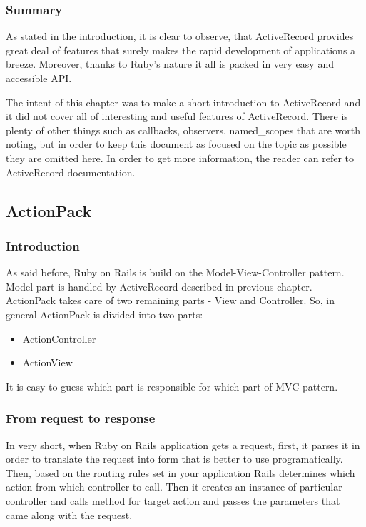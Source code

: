       \subsubsection{Summary}
      As stated in the introduction, it is clear to observe, that ActiveRecord provides great deal
      of features that surely makes the rapid development of applications a breeze. Moreover, thanks
      to Ruby's nature it all is packed in very easy and accessible API.

      The intent of this chapter was to make a short introduction to ActiveRecord and it did not cover
      all of interesting and useful features of ActiveRecord. There is plenty of other things such as
      callbacks, observers, named\_scopes that are worth noting, but in order to keep
      this document as focused on the topic as possible they are omitted here. In order to get more
      information, the reader can refer to ActiveRecord documentation.
      
    \subsection{ActionPack}
      \subsubsection{Introduction}
      As said before, Ruby on Rails is build on the Model-View-Controller pattern. Model part is
      handled by ActiveRecord described in previous chapter. ActionPack takes care of two remaining
      parts - View and Controller. So, in general ActionPack is divided into two parts:
      \begin{itemize}
        \item{ActionController}
        \item{ActionView}
      \end{itemize}
      It is easy to guess which part is responsible for which part of MVC pattern.
      
      \subsubsection{From request to response}
      In very short, when Ruby on Rails application gets a request, first, it parses it in order 
      to translate the request into form that is better to use programatically. Then, based on the
      routing rules set in your application Rails determines which action from which controller
      to call. Then it creates an instance of particular controller and calls method for 
      target action and passes the parameters that came along with the request.
      
